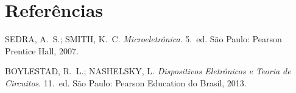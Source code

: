 \documentclass[11pt,a4paper]{article}
\begin{document}
\section{Referências}

\begin{referencias}
\item SEDRA, A.~S.; SMITH, K.~C. \emph{Microeletrônica}. 5.~ed. São
  Paulo: Pearson
  Prentice Hall, 2007.
\item BOYLESTAD, R.~L.; NASHELSKY, L. \emph{Dispositivos Eletrônicos e Teoria de
  Circuitos}. 11.~ed. São Paulo: Pearson Education do Brasil, 2013.
\end{referencias}
\end{document}
